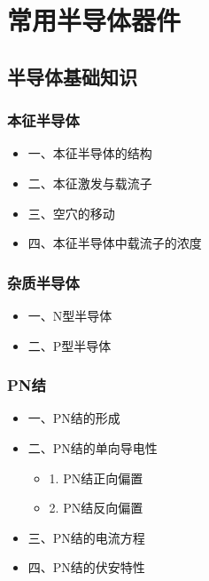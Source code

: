 \chapter{常用半导体器件}

\section{半导体基础知识}
\subsection{本征半导体}
\begin{itemize}
    \item 一、本征半导体的结构
    \item 二、本征激发与载流子
    \item 三、空穴的移动
    \item 四、本征半导体中载流子的浓度
\end{itemize}

\subsection{杂质半导体}
\begin{itemize}
    \item 一、N型半导体
    \item 二、P型半导体
\end{itemize}

\subsection{PN结}
\begin{itemize}
    \item 一、PN结的形成
    \item 二、PN结的单向导电性
    \begin{itemize}
        \item 1. PN结正向偏置
        \item 2. PN结反向偏置
    \end{itemize}
    \item 三、PN结的电流方程
    \item 四、PN结的伏安特性
\end{itemize}


